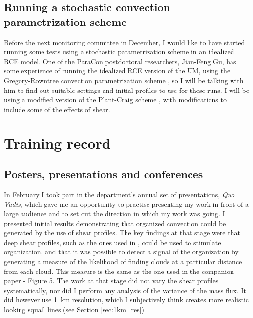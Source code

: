 \documentclass[11pt,a4paper]{article}
\begin{document}
\subsection{Running a stochastic convection parametrization scheme}

Before the next monitoring committee in December, I would like to have started running some tests using a stochastic parametrization scheme in an idealized RCE model. One of the ParaCon postdoctoral researchers, Jian-Feng Gu, has some experience of running the idealized RCE version of the UM, using the Gregory-Rowntree convection parametrization scheme \parencite{gregory1990mass}, so I will be talking with him to find out suitable settings and initial profiles to use for these runs. I will be using a modified version of the Plant-Craig scheme \parencite{plant2008stochastic}, with modifications to include some of the effects of shear.

\section{Training record}
\label{sec:Training record}

\subsection{Posters, presentations and conferences}

In February I took part in the department's annual set of presentations, \textit{Quo Vadis}, which gave me an opportunity to practise presenting my work in front of a large audience and to set out the direction in which my work was going. I presented initial results demonstrating that organized convection could be generated by the use of shear profiles. The key findings at that stage were that deep shear profiles, such as the ones used in \cite{cohen2006fluctuations}, could be used to stimulate organization, and that it was possible to detect a signal of the organization by generating a measure of the likelihood of finding clouds at a particular distance from each cloud. This measure is the same as the one used in the companion paper \cite{muetz2017effects} - Figure 5. The work at that stage did not vary the shear profiles systematically, nor did I perform any analysis of the variance of the mass flux. It did however use \SI{1}{km} resolution, which I subjectively think creates more realistic looking squall lines (see Section \ref{sec:1km_res})
\end{document}
